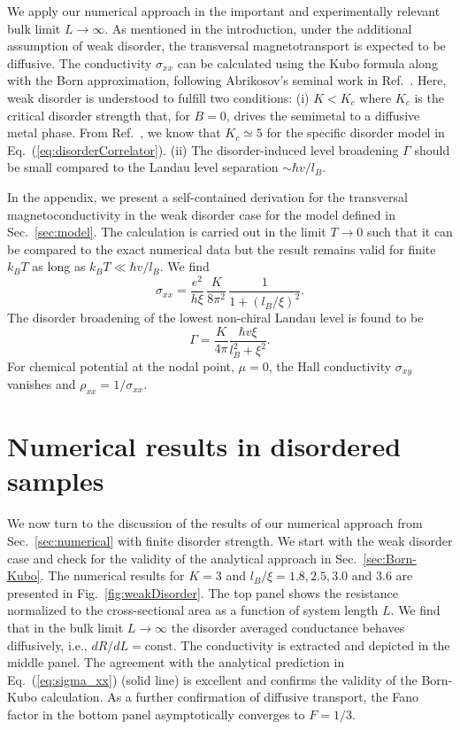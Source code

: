 \documentclass[aps,prb,10pt,amsmath,amssymb,twocolumn,floatfix,superscriptaddress,showpacs,numerical,footinbib]{revtex4-1}
\begin{document}
We apply our numerical approach in the important and experimentally relevant bulk limit $L\to \infty$.
%
As mentioned in the introduction, under the additional assumption of weak disorder, the transversal magnetotransport is expected to be diffusive.
%
The conductivity $\sigma_{xx}$ can be calculated using the Kubo formula along with the Born approximation, following Abrikosov's seminal work in Ref.~. Here, weak disorder is understood to fulfill two conditions: (i) $K<K_c$ where $K_c$ is the critical disorder strength that, for $B=0$, drives the semimetal to a diffusive metal phase. From Ref.~, we know that $K_c\simeq 5$ for the specific disorder model in Eq.~(\ref{eq:disorderCorrelator}). (ii) The disorder-induced level broadening $\Gamma$ should be small compared to the Landau level separation $\sim \hbar v/l_B$. 

In the appendix, we present a self-contained derivation for the transversal magnetoconductivity in the weak disorder case for the model defined in Sec.~\ref{sec:model}. The calculation is
carried out in the limit $T\rightarrow0$ such that it can be compared to the exact numerical data but the result remains valid for finite $k_{B}T$
as long as $k_{B}T\ll\hbar v/l_B$. We find
\begin{equation}
\sigma_{xx}=\frac{e^{2}}{h\xi} \, \frac{K}{8\pi^{2}} \, \frac{1}{1+(l_{B}/\xi)^{2}} .\label{eq:sigma_xx}
\end{equation}
The disorder broadening of the lowest non-chiral Landau level is found to be 
\begin{equation}
\Gamma=\frac{K}{4\pi} \frac{\hbar v\xi}{l_{B}^{2}+\xi^{2}}.
\label{Gamma}
\end{equation}
For chemical potential at the nodal point, $\mu=0$, the Hall conductivity $\sigma_{xy}$ vanishes \cite{Abrikosov1998,Klier2015} and $\rho_{xx}=1/\sigma_{xx}.$ 

\section{Numerical results in disordered samples \label{sec:results}}

We now turn to the discussion of the results of our numerical approach from Sec.~\ref{sec:numerical} with finite disorder strength. We start with the weak disorder case and check for the validity of the analytical approach in Sec.~\ref{sec:Born-Kubo}. The numerical results for $K=3$ and $l_B/\xi=1.8, 2.5, 3.0$ and $3.6$ are presented in Fig.~\ref{fig:weakDisorder}. The top panel shows the resistance normalized to the cross-sectional area as a function of system length $L$. We find that in the bulk limit $L\rightarrow\infty$ the disorder averaged conductance behaves diffusively, i.e., $dR/dL = \mathrm{const.}$ The conductivity is extracted and depicted in the middle panel. The agreement with the analytical prediction in Eq.~(\ref{eq:sigma_xx}) (solid line) is excellent and confirms the validity of the Born-Kubo calculation. As a further confirmation of diffusive transport, the Fano factor in the bottom panel asymptotically converges to $F=1/3$.
\end{document}
